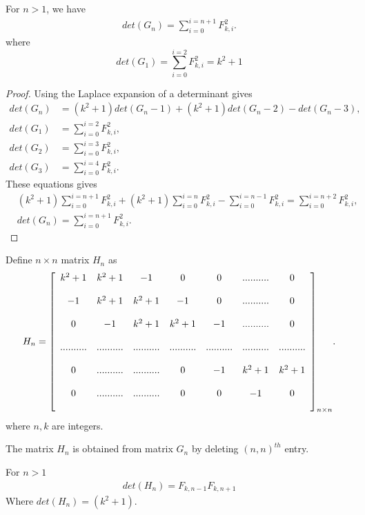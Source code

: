 \begin{theorem}\label{a7}
For $n > 1$, we have
\begin{align*}
det(G_n) = \sum_{i=0}^{i=n+1}F_{k,i}^2.
\end{align*}
where $$ det (G_1) = \sum_{i=0}^{i=2}F_{k,i}^2 = k^2+1$$
\end{theorem}
\begin{proof}
Using the Laplace expansion of a determinant gives
\begin{align*}
det(G_n) &= (k^2+1)det(G_n-1) + (k^2+1)det(G_n-2)- det(G_n-3),\\ 
det(G_1)& = \sum_{i=0}^{i=2}F_{k,i}^2,\\
det(G_2) &= \sum_{i=0}^{i=3}F_{k,i}^2,\\
det(G_3) &= \sum_{i=0}^{i=4}F_{k,i}^2.
\end{align*}
These equations gives
\begin{align*}
&(k^2+1)\sum_{i=0}^{i=n+1}F_{k,i}^2 +(k^2+1)\sum_{i=0}^{i=n}F_{k,i}^2 - \sum_{i=0}^{i=n-1}F_{k,i}^2  = \sum_{i=0}^{i=n+2}F_{k,i}^2,\\
&det(G_n) = \sum_{i=0}^{i=n+1}F_{k,i}^2.
\end{align*}
\end{proof}
\begin{definition}
Define $n \times n$ matrix $H_n$ as 
\begin{align*}
H_n = {\left[
          \begin{array}{ccccccc}
           \bigskip
            k^2+1 & k^2+1  & -1& 0 &0&..........&0 \\
             \bigskip
           -1 & k^2+1  & k^2+1& -1 &0&..........&0 \\
             \bigskip
           0 & -1  & k^2+1& k^2+1 &-1&..........&0 \\
           \bigskip
            .......... & .......... & ..........& .......... &..........&..........&.......... \\
           \bigskip
            0 & ..........&..........  & 0& -1 &k^2+1&k^2+1\\
            \bigskip
            0 & ..........&..........  & 0& 0 &-1&0\\
       \end{array}
        \right]_{n \times n}}.
\end{align*}
where  $n, k$ are integers.
\end{definition}
The matrix $ H_n $ is obtained from matrix $ G_n$ by deleting $(n, n)^{th}$ entry.
\begin{theorem}
For $n > 1 $
\begin{align*}
det (H_n) =  F_{k, n-1} F_{k, n+1}
\end{align*}
Where $ det (H_n) = (k^2+1) $.
\end{theorem}
